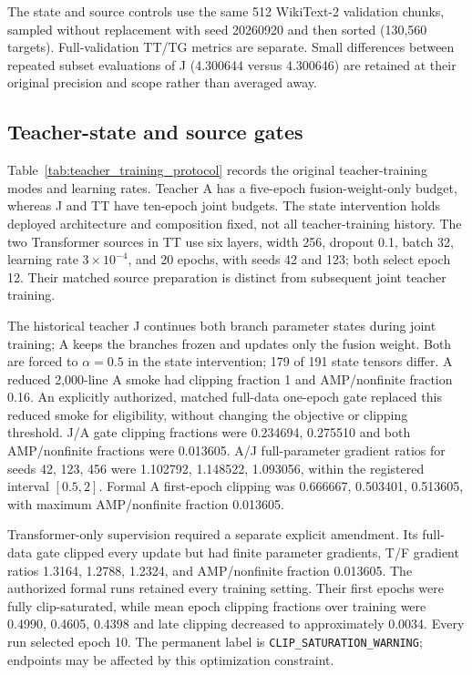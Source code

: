 The state and source controls use the same 512 WikiText-2 validation chunks, sampled without replacement with seed 20260920 and then sorted (130,560 targets). Full-validation TT/TG metrics are separate. Small differences between repeated subset evaluations of J (4.300644 versus 4.300646) are retained at their original precision and scope rather than averaged away.

\subsection{Teacher-state and source gates}

Table~\ref{tab:teacher_training_protocol} records the original teacher-training modes and learning rates. Teacher A has a five-epoch fusion-weight-only budget, whereas J and TT have ten-epoch joint budgets. The state intervention holds deployed architecture and composition fixed, not all teacher-training history. The two Transformer sources in TT use six layers, width 256, dropout 0.1, batch 32, learning rate $3\times10^{-4}$, and 20 epochs, with seeds 42 and 123; both select epoch 12. Their matched source preparation is distinct from subsequent joint teacher training.


The historical teacher J continues both branch parameter states during joint training; A keeps the branches frozen and updates only the fusion weight. Both are forced to $\alpha=0.5$ in the state intervention; 179 of 191 state tensors differ. A reduced 2,000-line A smoke had clipping fraction 1 and AMP/nonfinite fraction 0.16. An explicitly authorized, matched full-data one-epoch gate replaced this reduced smoke for eligibility, without changing the objective or clipping threshold. J/A gate clipping fractions were 0.234694, 0.275510 and both AMP/nonfinite fractions were 0.013605. A/J full-parameter gradient ratios for seeds 42, 123, 456 were 1.102792, 1.148522, 1.093056, within the registered interval $[0.5,2]$. Formal A first-epoch clipping was 0.666667, 0.503401, 0.513605, with maximum AMP/nonfinite fraction 0.013605.

Transformer-only supervision required a separate explicit amendment. Its full-data gate clipped every update but had finite parameter gradients, T/F gradient ratios 1.3164, 1.2788, 1.2324, and AMP/nonfinite fraction 0.013605. The authorized formal runs retained every training setting. Their first epochs were fully clip-saturated, while mean epoch clipping fractions over training were 0.4990, 0.4605, 0.4398 and late clipping decreased to approximately 0.0034. Every run selected epoch 10. The permanent label is \texttt{CLIP\_SATURATION\_WARNING}; endpoints may be affected by this optimization constraint.


